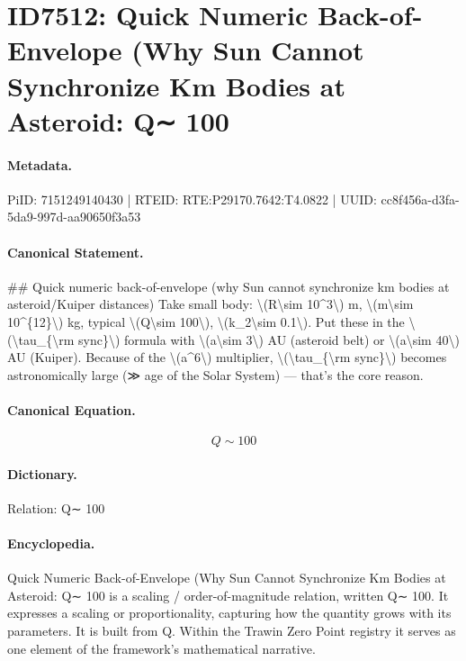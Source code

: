 \section*{ID7512: Quick Numeric Back-of-Envelope (Why Sun Cannot Synchronize Km Bodies at Asteroid: Q∼ 100}
\paragraph{Metadata.}
PiID: 7151249140430 | RTEID: RTE:P29170.7642:T4.0822 | UUID: cc8f456a-d3fa-5da9-997d-aa90650f3a53

\paragraph{Canonical Statement.}
\#\# Quick numeric back-of-envelope (why Sun cannot synchronize km bodies at asteroid/Kuiper distances) Take small body: \textbackslash{}(R\textbackslash{}sim 10\textasciicircum{}3\textbackslash{}) m, \textbackslash{}(m\textbackslash{}sim 10\textasciicircum{}\{12\}\textbackslash{}) kg, typical \textbackslash{}(Q\textbackslash{}sim 100\textbackslash{}), \textbackslash{}(k\_2\textbackslash{}sim 0.1\textbackslash{}). Put these in the \textbackslash{}(\textbackslash{}tau\_\{\textbackslash{}rm sync\}\textbackslash{}) formula with \textbackslash{}(a\textbackslash{}sim 3\textbackslash{}) AU (asteroid belt) or \textbackslash{}(a\textbackslash{}sim 40\textbackslash{}) AU (Kuiper). Because of the \textbackslash{}(a\textasciicircum{}6\textbackslash{}) multiplier, \textbackslash{}(\textbackslash{}tau\_\{\textbackslash{}rm sync\}\textbackslash{}) becomes astronomically large (≫ age of the Solar System) — that’s the core reason.

\paragraph{Canonical Equation.}
\[
Q\sim 100
\]

\paragraph{Dictionary.}
Relation: Q∼ 100

\paragraph{Encyclopedia.}
Quick Numeric Back-of-Envelope (Why Sun Cannot Synchronize Km Bodies at Asteroid: Q∼ 100 is a scaling / order-of-magnitude relation, written Q∼ 100. It expresses a scaling or proportionality, capturing how the quantity grows with its parameters. It is built from Q. Within the Trawin Zero Point registry it serves as one element of the framework's mathematical narrative.

